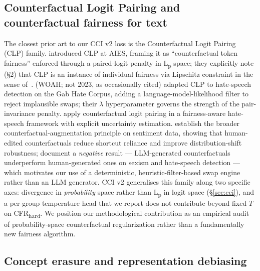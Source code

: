 \documentclass[10pt,a4paper]{article}
\begin{document}
\subsection{Counterfactual Logit Pairing and counterfactual fairness for text}
\label{sec:related:clp}

The closest prior art to our CCI v2 loss is the Counterfactual Logit Pairing (CLP) family. \citet{garg2019counterfactual} introduced CLP at AIES, framing it as ``counterfactual token fairness'' enforced through a paired-logit penalty in L\textsubscript{p} space; they explicitly note (\S2) that CLP is an instance of individual fairness via Lipschitz constraint in the sense of~\citet{dwork2012fairness}. \citet{davani2021improving} (WOAH; not 2023, as occasionally cited) adapted CLP to hate-speech detection on the Gab Hate Corpus, adding a language-model-likelihood filter to reject implausible swaps; their $\lambda$ hyperparameter governs the strength of the pair-invariance penalty. \citet{mou2024fairness} apply counterfactual logit pairing in a fairness-aware hate-speech framework with explicit uncertainty estimation. \citet{kaushik2020learning} establish the broader counterfactual-augmentation principle on sentiment data, showing that human-edited counterfactuals reduce shortcut reliance and improve distribution-shift robustness; \citet{sen2023people} document a \emph{negative} result --- LLM-generated counterfactuals underperform human-generated ones on sexism and hate-speech detection --- which motivates our use of a deterministic, heuristic-filter-based swap engine rather than an LLM generator. CCI v2 generalises this family along two specific axes: divergence in \emph{probability} space rather than L\textsubscript{p} in logit space (\S\ref{sec:cci}), and a per-group temperature head that we report does not contribute beyond fixed-$T$ on CFR\textsubscript{hard}. We position our methodological contribution as an empirical audit of probability-space counterfactual regularization rather than a fundamentally new fairness algorithm.

\subsection{Concept erasure and representation debiasing}
\label{sec:related:erasure}
\end{document}

